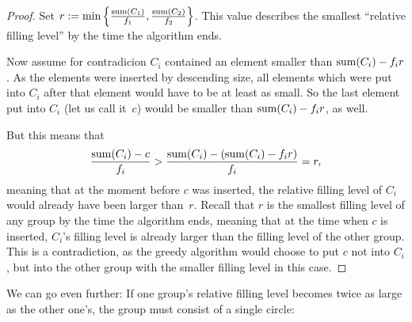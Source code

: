 \documentclass[a4paper,style=print,oneside,bibliography=totoc,nexus,lnum,extramargin]{tubsbook}
\begin{document}
\begin{proof}
    Set $r := \min\left\{\frac{\operatorname{sum}(C_1)}{f_1},\frac{\operatorname{sum}(C_2)}{f_2}\right\}$. This value describes the smallest “relative filling level” by the time the algorithm ends.

    Now assume for contradicion $C_i$ contained an element smaller than $\operatorname{sum}(C_i) - f_i r$. As the elements were inserted by descending size, all elements which were put into $C_i$ after that element would have to be at least as small. So the last element put into $C_i$ (let us call it~$c$) would be smaller than $\operatorname{sum}(C_i) - f_i r$, as well.

    But this means that $$\frac{\operatorname{sum}(C_i) - c}{f_i} > \frac{\operatorname{sum}(C_i) - (\operatorname{sum}(C_i) - f_i r)}{f_i} = r,$$ meaning that at the moment before $c$ was inserted, the relative filling level of $C_i$ would already have been larger than~$r$.
    Recall that $r$ is the smallest filling level of any group by the time the algorithm ends, meaning that at the time when $c$ is inserted, $C_i$'s filling level is already larger than the filling level of the other group.
    This is a contradiction, as the greedy algorithm would choose to put $c$ not into $C_i$, but into the other group with the smaller filling level in this case.
\end{proof}

We can go even further: If one group's relative filling level becomes twice as large as the other one's, the group must consist of a single circle:
\end{document}
